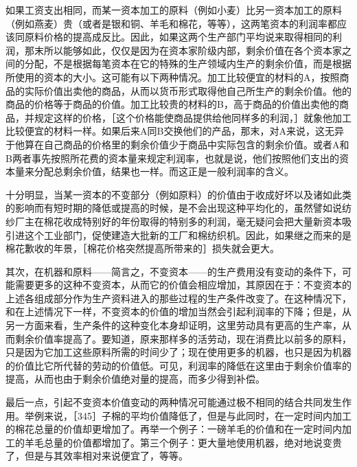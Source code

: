 如果工资支出相同，而某一资本加工的原料（例如小麦）比另一资本加工的原料（例如燕麦）贵（或者是银和铜、羊毛和棉花，等等），这两笔资本的利润率都应该同原料价格的提高成反比。因此，如果这两个生产部门平均说来取得相同的利润，那末所以能够如此，仅仅是因为在资本家阶级内部，剩余价值在各个资本家之间的分配，不是根据每笔资本在它的特殊的生产领域内生产的剩余价值，而是根据所使用的资本的大小。这可能有以下两种情况。加工比较便宜的材料的A，按照商品的实际价值出卖他的商品，从而以货币形式取得他自己所生产的剩余价值。他的商品的价格等于商品的价值。加工比较贵的材料的B，高于商品的价值出卖他的商品，并规定这样的价格，［这个价格能使商品提供给他同样多的利润，］就象他加工比较便宜的材料一样。如果后来A同B交换他们的产品，那末，对A来说，这无异于他算在自己商品的价格里的剩余价值少于商品中实际包含的剩余价值。或者A和B两者事先按照所花费的资本量来规定利润率，也就是说，他们按照他们支出的资本量来分配总剩余价值，结果也一样。而这正是一般利润率的含义。

十分明显，当某一资本的不变部分（例如原料）的价值由于收成好坏以及诸如此类的影响而有短时期的降低或提高的时候，是不会出现这种平均化的，虽然譬如说纺纱厂主在棉花收成特别好的年份取得的特别多的利润，毫无疑问会把大量新资本吸引进这个工业部门，促使建造大批新的工厂和棉纺织机。因此，如果继之而来的是棉花歉收的年景，［棉花价格突然提高所带来的］损失就会更大。

其次，在机器和原料——简言之，不变资本——的生产费用没有变动的条件下，可能需要更多的这种不变资本，从而它的价值会相应增加，其原因在于：不变资本的上述各组成部分作为生产资料进入的那些过程的生产条件改变了。在这种情况下，和在上述情况下一样，不变资本的价值的增加当然会引起利润率的下降；但是，从另一方面来看，生产条件的这种变化本身却证明，这里劳动具有更高的生产率，从而剩余价值率提高了。要知道，原来那样多的活劳动，现在消费比以前多的原料，只是因为它加工这些原料所需的时间少了；现在使用更多的机器，也只是因为机器的价值比它所代替的劳动的价值低。可见，利润率的降低在这里由于剩余价值率的提高，从而也由于剩余价值绝对量的提高，而多少得到补偿。

最后一点，引起不变资本价值变动的两种情况可能通过极不相同的结合共同发生作用。举例来说，［345］子棉的平均价值降低了，但是与此同时，在一定时间内加工的棉花总量的价值却更增加了。再举一个例子：一磅羊毛的价值和在一定时间内加工的羊毛总量的价值都增加了。第三个例子：更大量地使用机器，绝对地说变贵了，但是与其效率相对来说便宜了，等等。

